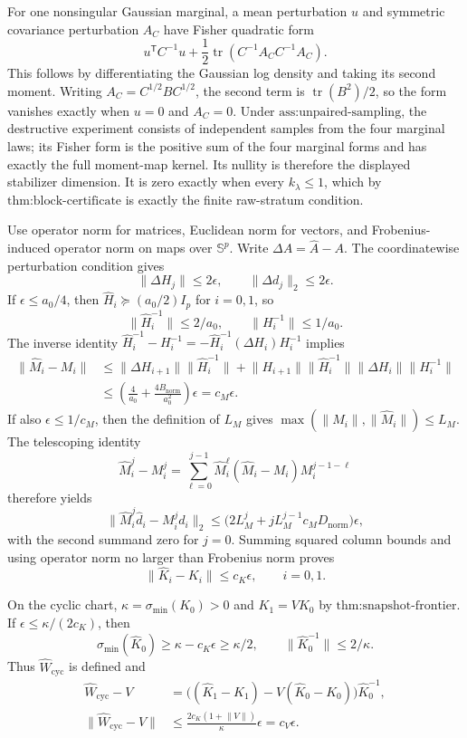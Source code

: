 For one nonsingular Gaussian marginal, a mean perturbation \(u\) and symmetric covariance perturbation \(A_C\) have Fisher quadratic form
\[
 u^{\mathsf T}C^{-1}u+
 \frac12\operatorname{tr}(C^{-1}A_CC^{-1}A_C).
\]
This follows by differentiating the Gaussian log density and taking its second moment.  Writing \(A_C=C^{1/2}BC^{1/2}\), the second term is \(\operatorname{tr}(B^2)/2\), so the form vanishes exactly when \(u=0\) and \(A_C=0\).  Under \(\text{ass:unpaired-sampling}\), the destructive experiment consists of independent samples from the four marginal laws; its Fisher form is the positive sum of the four marginal forms and has exactly the full moment-map kernel.  Its nullity is therefore the displayed stabilizer dimension.  It is zero exactly when every \(k_\lambda\leq1\), which by \(\text{thm:block-certificate}\) is exactly the finite raw-stratum condition.

Use operator norm for matrices, Euclidean norm for vectors, and Frobenius-induced operator norm on maps over \(\mathbb S^p\).  Write \(\Delta A=\widehat A-A\).  The coordinatewise perturbation condition gives
\[
 \lVert\Delta H_j\rVert\leq2\epsilon,\qquad
 \lVert\Delta d_j\rVert_2\leq2\epsilon.
\]
If \(\epsilon\leq a_0/4\), then \(\widehat H_i\succeq(a_0/2)I_p\) for \(i=0,1\), so
\[
 \lVert\widehat H_i^{-1}\rVert\leq2/a_0,\qquad
 \lVert H_i^{-1}\rVert\leq1/a_0.
\]
The inverse identity \(\widehat H_i^{-1}-H_i^{-1}=-\widehat H_i^{-1}(\Delta H_i)H_i^{-1}\) implies
\[
 \begin{aligned}
 \lVert\widehat M_i-M_i\rVert
 &\leq \lVert\Delta H_{i+1}\rVert\lVert\widehat H_i^{-1}\rVert
 +\lVert H_{i+1}\rVert\lVert\widehat H_i^{-1}\rVert
   \lVert\Delta H_i\rVert\lVert H_i^{-1}\rVert\\
 &\leq\left(\frac4{a_0}+\frac{4B_{\mathrm{norm}}}{a_0^2}\right)\epsilon
 =c_M\epsilon.
 \end{aligned}
\]
If also \(\epsilon\leq1/c_M\), then the definition of \(L_M\) gives \(\max(\lVert M_i\rVert,\lVert\widehat M_i\rVert)\leq L_M\).  The telescoping identity
\[
 \widehat M_i^j-M_i^j
 =\sum_{\ell=0}^{j-1}\widehat M_i^\ell
 (\widehat M_i-M_i)M_i^{j-1-\ell}
\]
therefore yields
\[
 \lVert\widehat M_i^j\widehat d_i-M_i^jd_i\rVert_2
 \leq\bigl(2L_M^j+jL_M^{j-1}c_MD_{\mathrm{norm}}\bigr)\epsilon,
\]
with the second summand zero for \(j=0\).  Summing squared column bounds and using operator norm no larger than Frobenius norm proves
\[
 \lVert\widehat K_i-K_i\rVert\leq c_K\epsilon,\qquad i=0,1.
\]

On the cyclic chart, \(\kappa=\sigma_{\min}(K_0)>0\) and \(K_1=VK_0\) by \(\text{thm:snapshot-frontier}\).  If \(\epsilon\leq\kappa/(2c_K)\), then
\[
 \sigma_{\min}(\widehat K_0)\geq\kappa-c_K\epsilon\geq\kappa/2,
 \qquad \lVert\widehat K_0^{-1}\rVert\leq2/\kappa.
\]
Thus \(\widehat W_{\mathrm{cyc}}\) is defined and
\[
 \begin{aligned}
 \widehat W_{\mathrm{cyc}}-V
 &=\bigl((\widehat K_1-K_1)-V(\widehat K_0-K_0)\bigr)\widehat K_0^{-1},\\
 \lVert\widehat W_{\mathrm{cyc}}-V\rVert
 &\leq\frac{2c_K(1+\lVert V\rVert)}\kappa\epsilon=c_V\epsilon.
 \end{aligned}
\]

